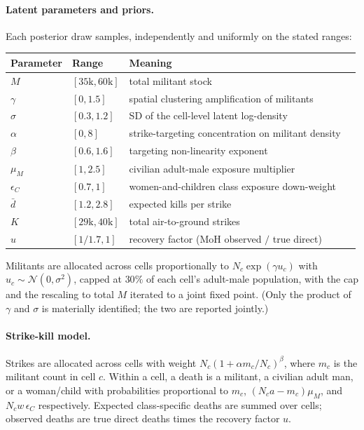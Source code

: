 \paragraph{Latent parameters and priors.} Each posterior draw samples, independently and uniformly on the stated ranges:

\begin{center}
\begin{small}
\begin{tabular}{@{}llll@{}}
\toprule
Parameter & Range & Meaning \\
\midrule
$M$        & $[35\mathrm{k},60\mathrm{k}]$ & total militant stock \\
$\gamma$   & $[0,1.5]$   & spatial clustering amplification of militants \\
$\sigma$   & $[0.3,1.2]$ & SD of the cell-level latent log-density \\
$\alpha$   & $[0,8]$     & strike-targeting concentration on militant density \\
$\beta$    & $[0.6,1.6]$ & targeting non-linearity exponent \\
$\mu_M$    & $[1,2.5]$   & civilian adult-male exposure multiplier \\
$\epsilon_C$ & $[0.7,1]$ & women-and-children class exposure down-weight \\
$\bar d$   & $[1.2,2.8]$ & expected kills per strike \\
$K$        & $[29\mathrm{k},40\mathrm{k}]$ & total air-to-ground strikes \\
$u$        & $[1/1.7,1]$ & recovery factor (MoH observed $/$ true direct) \\
\bottomrule
\end{tabular}
\end{small}
\end{center}

Militants are allocated across cells proportionally to $N_c\exp(\gamma u_c)$ with $u_c\sim\mathcal N(0,\sigma^2)$, capped at $30\%$ of each cell's adult-male population, with the cap and the rescaling to total $M$ iterated to a joint fixed point. (Only the product of $\gamma$ and $\sigma$ is materially identified; the two are reported jointly.)

\paragraph{Strike-kill model.} Strikes are allocated across cells with weight $N_c(1+\alpha m_c/N_c)^{\beta}$, where $m_c$ is the militant count in cell $c$. Within a cell, a death is a militant, a civilian adult man, or a woman/child with probabilities proportional to $m_c$, $(N_c a - m_c)\mu_M$, and $N_c w\,\epsilon_C$ respectively. Expected class-specific deaths are summed over cells; observed deaths are true direct deaths times the recovery factor $u$.

